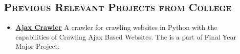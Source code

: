 \begin{resume}




\section{\textsc{Previous Relevant Projects from College}}

\begin{itemize}

\item \textbf{\href{https://github.com/dip-kush/workflow_validation_temp}{\textbf{Ajax Crawler}}}
A crawler for crawling websites in Python with the capabilities of Crawling Ajax   
Based Websites. The is a part of Final Year Major Project.


\end{itemize}
\end{resume}
